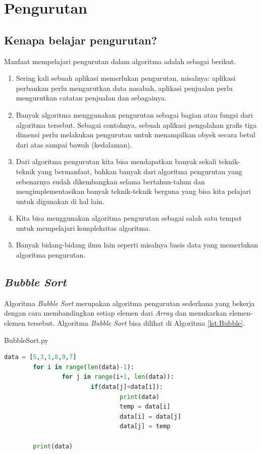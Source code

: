 \chapter{Pengurutan}

\section{Kenapa belajar pengurutan?}
Manfaat mempelajari pengurutan dalam algoritma adalah sebagai berikut.
\begin{enumerate}
	\item Sering kali sebuah aplikasi memerlukan pengurutan, misalnya: aplikasi perbankan perlu mengurutkan data nasabah, aplikasi penjualan perlu mengurutkan catatan penjualan dan sebagainya.
	\item Banyak algoritma menggunakan pengurutan sebagai bagian atau fungsi dari algoritma tersebut. Sebagai contohnya, sebuah aplikasi pengolahan grafis tiga dimensi perlu melakukan pengurutan untuk menampilkan obyek secara betul dari atas sampai bawah (kedalaman).
	\item Dari algoritma pengurutan kita bisa mendapatkan banyak sekali teknik-teknik yang bermanfaat, bahkan banyak dari algoritma pengurutan yang sebenarnya sudah dikembangkan selama bertahun-tahun dan mengimplementasikan banyak teknik-teknik berguna yang bisa kita pelajari untuk digunakan di hal lain.
	\item Kita bisa menggunakan algoritma pengurutan sebagai salah satu tempat untuk mempelajari kompleksitas algoritma.
	\item Banyak bidang-bidang ilmu lain seperti misalnya basis data yang memerlukan algoritma pengurutan.
\end{enumerate}

\section{\textit{Bubble Sort}}
Algoritma \textit{Bubble Sort} merupakan algoritma pengurutan sederhana yang bekerja dengan cara membandingkan setiap elemen dari \textit{Array} dan menukarkan elemen-elemen tersebut. Algoritma \textit{Bubble Sort} bisa dilihat di Algoritma \ref{lst:Bubble}.

\begin{listprog}{BubbleSort.py}
	\label{lst:Bubble}
	\begin{lstlisting}[language=Python]
		data = [5,3,1,8,9,7]		
		for i in range(len(data)-1): 
				for j in range(i+1, len(data)):
						if(data[j]<data[i]):
								print(data)
								temp = data[i]
								data[i] = data[j]
								data[j] = temp

		print(data)
	\end{lstlisting}
\end{listprog}



